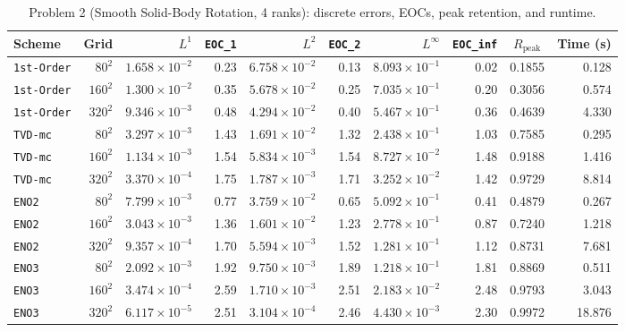 \documentclass[11pt,a4paper]{article}
\theoremstyle{definition}
\newcommand{\code}[1]{\texttt{#1}}
\begin{document}
\begin{table}[h]
\centering\scriptsize\setlength{\tabcolsep}{3.5pt}
\caption{Problem 2 (Smooth Solid-Body Rotation, 4 ranks): discrete errors, EOCs, peak retention, and runtime.}
\label{tab:p2}
\begin{tabular}{@{}lrrrrrrrcr@{}}
\toprule
\textbf{Scheme} & \textbf{Grid} & $L^1$ & \code{EOC\_1} & $L^2$ & \code{EOC\_2} & $L^\infty$ & \code{EOC\_inf} & $R_{\text{peak}}$ & \textbf{Time (s)} \\
\midrule
\code{1st-Order} & $80^2$  & $1.658\times 10^{-2}$ & 0.23 & $6.758\times 10^{-2}$ & 0.13 & $8.093\times 10^{-1}$ & 0.02 & 0.1855 & 0.128 \\
\code{1st-Order} & $160^2$ & $1.300\times 10^{-2}$ & 0.35 & $5.678\times 10^{-2}$ & 0.25 & $7.035\times 10^{-1}$ & 0.20 & 0.3056 & 0.574 \\
\code{1st-Order} & $320^2$ & $9.346\times 10^{-3}$ & 0.48 & $4.294\times 10^{-2}$ & 0.40 & $5.467\times 10^{-1}$ & 0.36 & 0.4639 & 4.330 \\
\midrule
\code{TVD-mc}    & $80^2$  & $3.297\times 10^{-3}$ & 1.43 & $1.691\times 10^{-2}$ & 1.32 & $2.438\times 10^{-1}$ & 1.03 & 0.7585 & 0.295 \\
\code{TVD-mc}    & $160^2$ & $1.134\times 10^{-3}$ & 1.54 & $5.834\times 10^{-3}$ & 1.54 & $8.727\times 10^{-2}$ & 1.48 & 0.9188 & 1.416 \\
\code{TVD-mc}    & $320^2$ & $3.370\times 10^{-4}$ & 1.75 & $1.787\times 10^{-3}$ & 1.71 & $3.252\times 10^{-2}$ & 1.42 & 0.9729 & 8.814 \\
\midrule
\code{ENO2}      & $80^2$  & $7.799\times 10^{-3}$ & 0.77 & $3.759\times 10^{-2}$ & 0.65 & $5.092\times 10^{-1}$ & 0.41 & 0.4879 & 0.267 \\
\code{ENO2}      & $160^2$ & $3.043\times 10^{-3}$ & 1.36 & $1.601\times 10^{-2}$ & 1.23 & $2.778\times 10^{-1}$ & 0.87 & 0.7240 & 1.218 \\
\code{ENO2}      & $320^2$ & $9.357\times 10^{-4}$ & 1.70 & $5.594\times 10^{-3}$ & 1.52 & $1.281\times 10^{-1}$ & 1.12 & 0.8731 & 7.681 \\
\midrule
\code{ENO3}      & $80^2$  & $2.092\times 10^{-3}$ & 1.92 & $9.750\times 10^{-3}$ & 1.89 & $1.218\times 10^{-1}$ & 1.81 & 0.8869 & 0.511 \\
\code{ENO3}      & $160^2$ & $3.474\times 10^{-4}$ & 2.59 & $1.710\times 10^{-3}$ & 2.51 & $2.183\times 10^{-2}$ & 2.48 & 0.9793 & 3.043 \\
\code{ENO3}      & $320^2$ & $6.117\times 10^{-5}$ & 2.51 & $3.104\times 10^{-4}$ & 2.46 & $4.430\times 10^{-3}$ & 2.30 & 0.9972 & 18.876 \\

\end{tabular}
\end{table}
\end{document}
